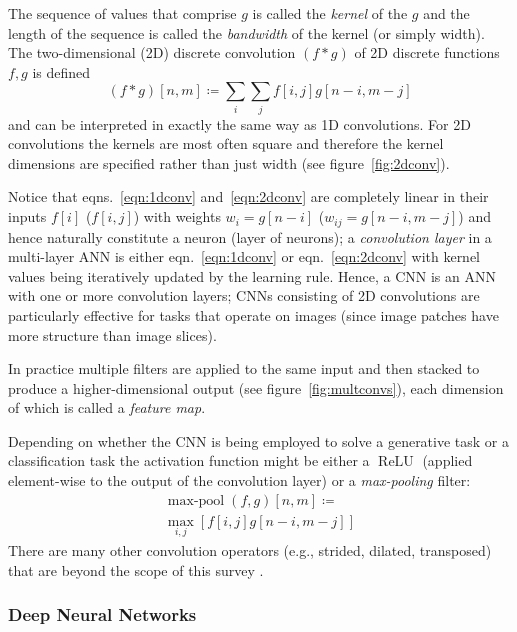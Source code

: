 %
The sequence of values that comprise \(g\) is called the \textit{kernel} of the \(g\) and the length of the sequence is called the \textit{bandwidth} of the kernel (or simply width).
%
The two-dimensional (2D) discrete convolution \((f*g)\) of 2D discrete functions \(f,g\) is defined
\begin{equation}
    (f*g)[n, m]\coloneqq \sum _{i}\sum _{j}f[i, j]g[n-i, m-j]
    \label{eqn:2dconv}
\end{equation}
and can be interpreted in exactly the same way as 1D convolutions.
%
For 2D convolutions the kernels are most often square and therefore the kernel dimensions are specified rather than just width (see figure~\ref{fig:2dconv}).


Notice that eqns.~\eqref{eqn:1dconv} and~\eqref{eqn:2dconv} are completely linear in their inputs \(f[i]\) (\(f[i,j]\)) with weights \(w_i = g[n-i]\) (\(w_{ij} = g[n-i, m-j]\)) and hence naturally constitute a neuron (layer of neurons); a \textit{convolution layer} in a multi-layer ANN is either eqn.~\eqref{eqn:1dconv} or eqn.~\eqref{eqn:2dconv} with kernel values being iteratively updated by the learning rule.
%
Hence, a CNN is an ANN with one or more convolution layers; CNNs consisting of 2D convolutions are particularly effective for tasks that operate on images (since image patches have more structure than image slices).

In practice multiple filters are applied to the same input and then stacked to produce a higher-dimensional output (see figure~\ref{fig:multconvs}), each dimension of which is called a \textit{feature map}.

%
Depending on whether the CNN is being employed to solve a generative task or a classification task the activation function might be either a \(\operatorname{ReLU}\) (applied element-wise to the output of the convolution layer) or a \textit{max-pooling} filter:
\begin{multline}
    \operatorname{max-pool}(f,g)[n, m]\coloneqq\\ \max_{i,j}\left[ f[i, j]g[n-i, m-j] \right]
    \label{eqn:2dpool}
\end{multline}
There are many other convolution operators (e.g., strided, dilated, transposed) that are beyond the scope of this survey \cite{dumoulin2016guide}.





\subsubsection{Deep Neural Networks}\label{subsubsec:dnns}





